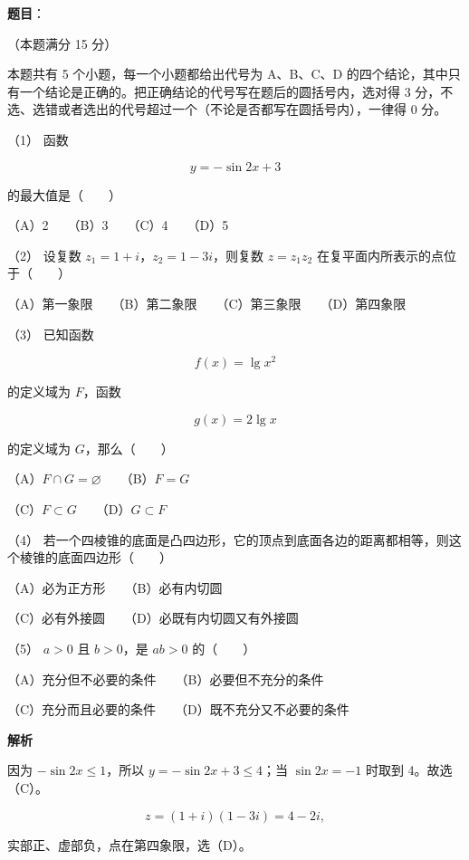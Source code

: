 \begin{answer}

\textbf{题目}：

（本题满分 15 分）

本题共有 5 个小题，每一个小题都给出代号为 A、B、C、D 的四个结论，其中只有一个结论是正确的。把正确结论的代号写在题后的圆括号内，选对得 3 分，不选、选错或者选出的代号超过一个（不论是否都写在圆括号内），一律得 0 分。

（1） 函数

\nopagebreak[4]
\[
y=-\sin2x+3
\]

的最大值是\mbox{（　　）}

（A）2　　（B）3　　（C）4　　（D）5

（2） 设复数 $z_1=1+i$，$z_2=1-3i$，则复数
$z=z_1z_2$ 在复平面内所表示的点位于\mbox{（　　）}

（A）第一象限　　（B）第二象限　　（C）第三象限　　（D）第四象限

（3） 已知函数

\nopagebreak[4]
\[
f(x)=\lg x^2
\]

的定义域为 $F$，函数

\nopagebreak[4]
\[
g(x)=2\lg x
\]

的定义域为 $G$，那么\mbox{（　　）}

（A）$F\cap G=\varnothing$　　（B）$F=G$

（C）$F\subset G$　　（D）$G\subset F$

（4） 若一个四棱锥的底面是凸四边形，它的顶点到底面各边的距离都相等，则这个棱锥的底面四边形\mbox{（　　）}

（A）必为正方形　　（B）必有内切圆

（C）必有外接圆　　（D）必既有内切圆又有外接圆

（5） $a>0$ 且 $b>0$，是 $ab>0$ 的\mbox{（　　）}

（A）充分但不必要的条件　　（B）必要但不充分的条件

（C）充分而且必要的条件　　（D）既不充分又不必要的条件

\textbf{解析}


因为 $-\sin2x\le1$，所以 $y=-\sin2x+3\le4$；当
$\sin2x=-1$ 时取到 4。故选（C）。


\nopagebreak[4]
\[
z=(1+i)(1-3i)=4-2i,
\]

实部正、虚部负，点在第四象限，选（D）。


\end{answer}
